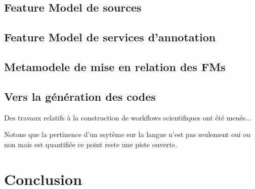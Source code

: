 \documentclass[]{easychair}
\begin{document}
\subsection{Feature Model de sources}
\subsection{Feature Model de services d'annotation}
\subsection{Metamodele de mise en relation des FMs}

\subsection{Vers la génération des codes}

Des travaux relatifs à la construction de workflows scientifiques ont été menés...

Notons que la pertinence d'un ssytème sur la langue n'est pas seulement oui ou non mais est quantifiée ce point reste une piste ouverte.


\section{Conclusion}
\label{sect:conclusion}



%
\label{sect:bib}

%
%
%


\appendix


\end{document}
